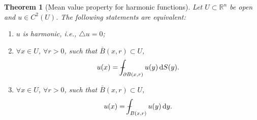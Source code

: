 \documentclass[a4paper,9pt]{amsart}
\newcommand{\R}{\mathbb{R}}	%
\newcommand{\did}{\,\mathrm{d}}	%
\newcommand{\de}{\partial}		%
\newcommand{\laplacian}{\triangle}
\def\Xint#1{\mathchoice
      {\XXint\displaystyle\textstyle{#1}}%
      {\XXint\textstyle\scriptstyle{#1}}%
      {\XXint\scriptstyle\scriptscriptstyle{#1}}%
      {\XXint\scriptscriptstyle\scriptscriptstyle{#1}}%
      \!\int}
\def\XXint#1#2#3{{\setbox0=\hbox{$#1{#2#3}{\int}$}
        \vcenter{\hbox{$#2#3$}}\kern-.5\wd0}}
\def\fint{\Xint-}
\theoremstyle{plain}
\newtheorem{theorem}[proposition]{Theorem}
\theoremstyle{definition}
\theoremstyle{remark}
\begin{document}
\begin{theorem}[Mean value property for harmonic functions]\label{teo67bac805}
	Let $U\subset\R^n$ be open and $u\in C^2(U)$.
	The following statements are equivalent:
	\begin{enumerate}[label=(\roman*)]
	\item\label{teo67bac805_i}
		$u$ is harmonic, i.e., $\laplacian u =0$;
	\item\label{teo67bac805_ii}
		$\forall x\in U$, $\forall r>0$, such that $\bar B(x,r)\subset U$,
		\begin{equation}\label{eq67bac950}
			u(x) = \fint_{\de B(x,r)} u(y) \did S(y) .
		\end{equation}
	\item\label{teo67bac805_iii}
		$\forall x\in U$, $\forall r>0$, such that $\bar B(x,r)\subset U$,
		\begin{equation}\label{eq67bac961}
			u(x) = \fint_{B(x,r)} u(y) \did y .
		\end{equation}
	\end{enumerate}
\end{theorem}
\end{document}

